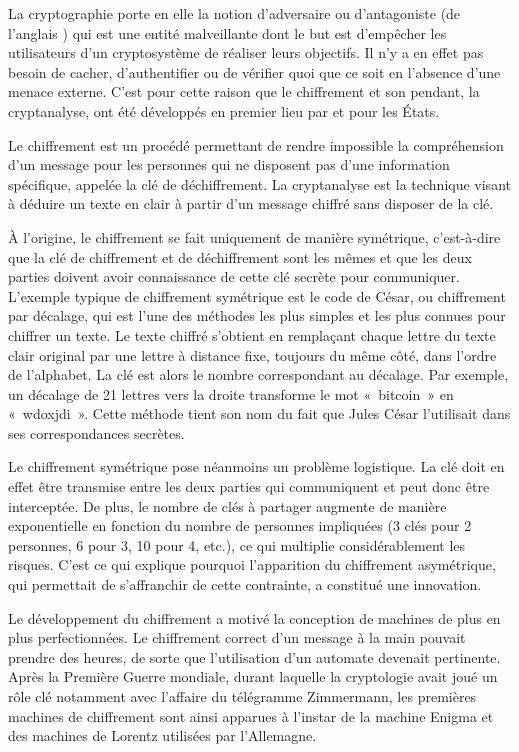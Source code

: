 La cryptographie porte en elle la notion d'adversaire ou d'antagoniste (de l'anglais ) qui est une entité malveillante dont le but est d'empêcher les utilisateurs d'un cryptosystème de réaliser leurs objectifs. Il n'y a en effet pas besoin de cacher, d'authentifier ou de vérifier quoi que ce soit en l'absence d'une menace externe. C'est pour cette raison que le chiffrement et son pendant, la cryptanalyse, ont été développés en premier lieu par et pour les États. %

Le chiffrement est un procédé permettant de rendre impossible la compréhension d'un message pour les personnes qui ne disposent pas d'une information spécifique, appelée la clé de déchiffrement. La cryptanalyse est la technique visant à déduire un texte en clair à partir d'un message chiffré sans disposer de la clé.

À l'origine, le chiffrement se fait uniquement de manière symétrique, c'est-à-dire que la clé de chiffrement et de déchiffrement sont les mêmes et que les deux parties doivent avoir connaissance de cette clé secrète pour communiquer. L'exemple typique de chiffrement symétrique est le code de César, ou chiffrement par décalage, qui est l'une des méthodes les plus simples et les plus connues pour chiffrer un texte. Le texte chiffré s'obtient en remplaçant chaque lettre du texte clair original par une lettre à distance fixe, toujours du même côté, dans l'ordre de l'alphabet. La clé est alors le nombre correspondant au décalage. Par exemple, un décalage de 21 lettres vers la droite transforme le mot «~bitcoin~» en «~wdoxjdi~». Cette méthode tient son nom du fait que Jules César l'utilisait dans ses correspondances secrètes.

\clearpage
Le chiffrement symétrique pose néanmoins un problème logistique. La clé doit en effet être transmise entre les deux parties qui communiquent et peut donc être interceptée. De plus, le nombre de clés à partager augmente de manière exponentielle en fonction du nombre de personnes impliquées (3 clés pour 2 personnes, 6 pour 3, 10 pour 4, etc.), ce qui multiplie considérablement les risques. C'est ce qui explique pourquoi l'apparition du chiffrement asymétrique, qui permettait de s'affranchir de cette contrainte, a constitué une innovation.

Le développement du chiffrement a motivé la conception de machines de plus en plus perfectionnées. Le chiffrement correct d'un message à la main pouvait prendre des heures, de sorte que l'utilisation d'un automate devenait pertinente. Après la Première Guerre mondiale, durant laquelle la cryptologie avait joué un rôle clé notamment avec l'affaire du télégramme Zimmermann, les premières machines de chiffrement sont ainsi apparues à l'instar de la machine Enigma et des machines de Lorentz utilisées par l'Allemagne.

